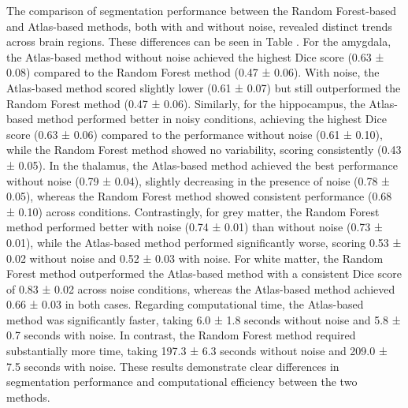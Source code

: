 The comparison of segmentation performance between the Random Forest-based and Atlas-based methods, both with and without noise, revealed distinct trends across brain regions. These differences can be seen in Table . For the amygdala, the Atlas-based method without noise achieved the highest Dice score (0.63 ± 0.08) compared to the Random Forest method (0.47 ± 0.06). With noise, the Atlas-based method scored slightly lower (0.61 ± 0.07) but still outperformed the Random Forest method (0.47 ± 0.06). Similarly, for the hippocampus, the Atlas-based method performed better in noisy conditions, achieving the highest Dice score (0.63 ± 0.06) compared to the performance without noise (0.61 ± 0.10), while the Random Forest method showed no variability, scoring consistently (0.43 ± 0.05).
In the thalamus, the Atlas-based method achieved the best performance without noise (0.79 ± 0.04), slightly decreasing in the presence of noise (0.78 ± 0.05), whereas the Random Forest method showed consistent performance (0.68 ± 0.10) across conditions. Contrastingly, for grey matter, the Random Forest method performed better with noise (0.74 ± 0.01) than without noise (0.73 ± 0.01), while the Atlas-based method performed significantly worse, scoring 0.53 ± 0.02 without noise and 0.52 ± 0.03 with noise. For white matter, the Random Forest method outperformed the Atlas-based method with a consistent Dice score of 0.83 ± 0.02 across noise conditions, whereas the Atlas-based method achieved 0.66 ± 0.03 in both cases.
Regarding computational time, the Atlas-based method was significantly faster, taking 6.0 ± 1.8 seconds without noise and 5.8 ± 0.7 seconds with noise. In contrast, the Random Forest method required substantially more time, taking 197.3 ± 6.3 seconds without noise and 209.0 ± 7.5 seconds with noise. These results demonstrate clear differences in segmentation performance and computational efficiency between the two methods.

